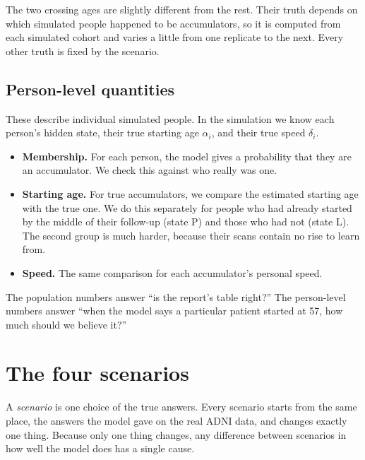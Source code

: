 \documentclass[11pt]{article}
\begin{document}
The two crossing ages are slightly different from the rest. Their truth depends on which simulated people happened to be accumulators, so it is computed from each simulated cohort and varies a little from one replicate to the next. Every other truth is fixed by the scenario.

\subsection{Person-level quantities}

These describe individual simulated people. In the simulation we know each person's hidden state, their true starting age $\alpha_i$, and their true speed $\delta_i$.

\begin{itemize}
  \item \textbf{Membership.} For each person, the model gives a probability that they are an accumulator. We check this against who really was one.
  \item \textbf{Starting age.} For true accumulators, we compare the estimated starting age with the true one. We do this separately for people who had already started by the middle of their follow-up (state P) and those who had not (state L). The second group is much harder, because their scans contain no rise to learn from.
  \item \textbf{Speed.} The same comparison for each accumulator's personal speed.
\end{itemize}

\begin{plain}
The population numbers answer ``is the report's table right?'' The person-level numbers answer ``when the model says a particular patient started at 57, how much should we believe it?''
\end{plain}

\section{The four scenarios}

A \emph{scenario} is one choice of the true answers. Every scenario starts from the same place, the answers the model gave on the real ADNI data, and changes exactly one thing. Because only one thing changes, any difference between scenarios in how well the model does has a single cause.
\end{document}
